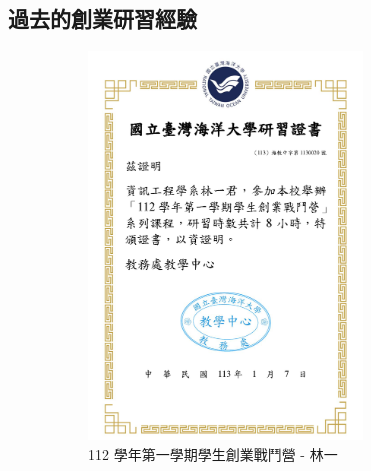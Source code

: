 \subsection{過去的創業研習經驗}
\label{fig:Appendix-Training}
\begin{figure}[H]
  \centering
  \begin{subfigure}{0.32\linewidth}
    \centering
    \includegraphics[width=0.8\textwidth]{images/training-1.png}
    \caption{112 學年第一學期學生創業戰鬥營 - 林一}
    \label{fig:Training-1}
  \end{subfigure}
  \begin{subfigure}{0.32\linewidth}
    \centering

\end{subfigure}
\end{figure}
